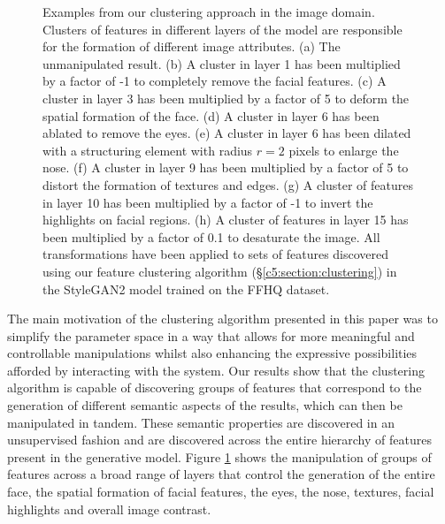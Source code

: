 \begin{figure}[!htbp]
        \hfill
        \hfill
       \caption[A comparison of different transforms being applied to different clusters in various layers of StyleGAN2]{Examples from our clustering approach in the image domain. Clusters  of features in different layers of the model are responsible for the formation of different image attributes. (a) The unmanipulated result. (b) A cluster in layer 1 has been multiplied by a factor of -1 to completely remove the facial features. (c) A cluster in layer 3 has been multiplied by a factor of 5 to deform the spatial formation of the face. (d) A cluster in layer 6 has been ablated to remove the eyes. (e) A cluster in layer 6 has been dilated with a structuring element with radius $r=2$ pixels to enlarge the nose. (f) A cluster in layer 9 has been multiplied by a factor of 5 to distort the formation of textures and edges. (g) A cluster of features in layer 10 has been multiplied by a factor of -1 to invert the highlights on facial regions. (h) A cluster of features in layer 15 has been multiplied by a factor of 0.1 to desaturate the image. All transformations have been applied to sets of features discovered using our feature clustering algorithm (\S\ref{c5:section:clustering}) in the StyleGAN2 model trained on the FFHQ dataset.}
       \label{fig:c5:cluster_layer_comp_image}
    \end{figure}

The main motivation of the clustering algorithm presented in this paper was to simplify the parameter space in a way that allows for more meaningful and controllable manipulations whilst also enhancing the expressive possibilities afforded by interacting with the system. Our results show that the clustering algorithm is capable of discovering groups of features that correspond to the generation of different semantic aspects of the results, which can then be manipulated in tandem. These semantic properties are discovered in an unsupervised fashion and are discovered across the entire hierarchy of features present in the generative model. Figure \ref{fig:c5:cluster_layer_comp_image} shows the manipulation of groups of features across a broad range of layers that control the generation of the entire face, the spatial formation of facial features, the eyes, the nose, textures, facial highlights and overall image contrast.

